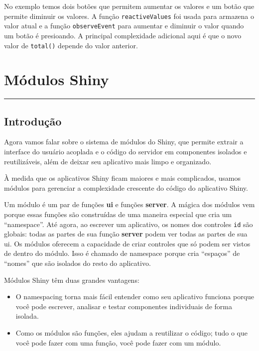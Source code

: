 \documentclass[
]{book}
\begin{document}
No exemplo temos dois botões que permitem aumentar os valores e um botão que permite diminuir os valores. A função \texttt{reactiveValues} foi usada para armazena o valor atual e a função \texttt{observeEvent} para aumentar e diminuir o valor quando um botão é presioando. A principal complexidade adicional aqui é que o novo valor de \texttt{total()} depende do valor anterior.

\hypertarget{muxf3dulos-shiny}{%
\chapter{\texorpdfstring{\textbf{Módulos Shiny}}{Módulos Shiny}}\label{muxf3dulos-shiny}}

\begin{center}\rule{0.5\linewidth}{0.5pt}\end{center}

\hypertarget{introduuxe7uxe3o-2}{%
\section{\texorpdfstring{\textbf{Introdução}}{Introdução}}\label{introduuxe7uxe3o-2}}

Agora vamos falar sobre o sistema de módulos do Shiny, que permite extrair a interface do usuário acoplada e o código do servidor em componentes isolados e reutilizáveis, além de deixar seu aplicativo mais limpo e organizado.

À medida que os aplicativos Shiny ficam maiores e mais complicados, usamos módulos para gerenciar a complexidade crescente do código do aplicativo Shiny.

Um módulo é um par de funções \textbf{ui} e funções \textbf{server}. A mágica dos módulos vem porque essas funções são construídas de uma maneira especial que cria um ``namespace''. Até agora, ao escrever um aplicativo, os nomes dos controles \texttt{id} são globais: todas as partes de sua função \textbf{server} podem ver todas as partes de sua ui. Os módulos oferecem a capacidade de criar controles que só podem ser vistos de dentro do módulo. Isso é chamado de namespace porque cria ``espaços'' de ``nomes'' que são isolados do resto do aplicativo.

Módulos Shiny têm duas grandes vantagens:

\begin{itemize}
\item
  O namespacing torna mais fácil entender como seu aplicativo funciona porque você pode escrever, analisar e testar componentes individuais de forma isolada.
\item
  Como os módulos são funções, eles ajudam a reutilizar o código; tudo o que você pode fazer com uma função, você pode fazer com um módulo.
\end{itemize}
\end{document}
